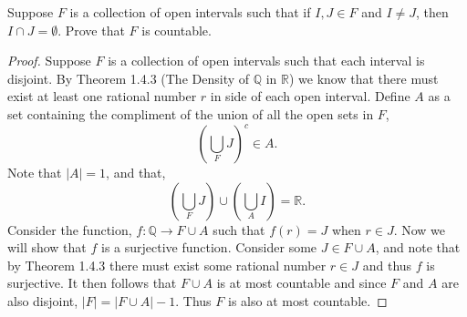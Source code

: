 \documentclass[12pt]{article}
\makeatletter
\theoremstyle{homework}
\newenvironment{exercise}[1]
{\def\@currentlabel{#1}\exercisecore}
{\endexercisecore}
\newcommand{\Reals}{\ensuremath{\mathbb R}}
\newcommand{\Rats}{\ensuremath{\mathbb Q}}
\makeatother
\begin{document}
\begin{exercise}{5} Suppose $F$ is a collection of open intervals such that if $I,J \in F$ and $I \neq J$, then $I \cap J = \emptyset$. Prove that $F$ is countable.\\

  \begin{proof}
    Suppose $F$ is a collection of open intervals such that each interval is disjoint. By Theorem 1.4.3 (The Density of $\Rats$ in $\Reals$) we 
    know that there must exist at least one rational number $r$ in side of each open interval. Define $A$ as a set containing the 
    compliment of the union of all the open sets in $F$,
    \begin{equation*}
     ( \bigcup_F J)^c \in A.
    \end{equation*}
    Note that $|A| = 1$, and that,
    \begin{equation*}
      (\bigcup_F J)\cup (\bigcup_A I) = \Reals.
    \end{equation*}
    Consider the function,
    $f: \Rats \to F \cup A$ such that $f(r) = J$ when $r \in J$. Now we will show that $f$ is a surjective function. Consider
    some $J \in F \cup A$, and note that by Theorem 1.4.3 there must exist some rational number $r \in J$ and thus $f$ is surjective. It then follows that $F \cup A$ is at most countable 
    and since $F$ and $A$ are also disjoint, $|F| = |F \cup A| - 1$. Thus $F$ is also at most countable. 
  \end{proof}

\end{exercise}

\vspace{.5in}
\end{document}
